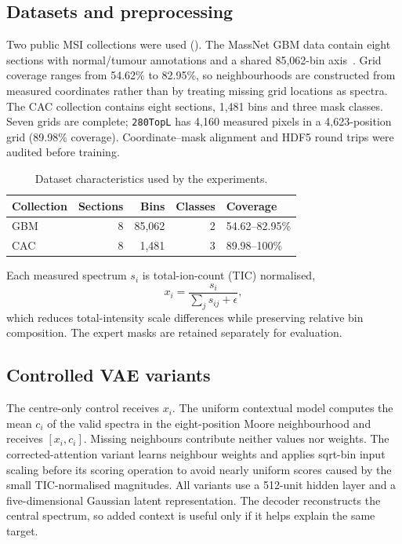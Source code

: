 \subsection{Datasets and preprocessing}

Two public MSI collections were used (). The MassNet GBM data
contain eight sections with normal/tumour annotations and a shared 85,062-bin
axis~\citep{abdelmoula2022massnet}. Grid coverage ranges from 54.62\% to
82.95\%, so neighbourhoods are constructed from measured coordinates rather
than by treating missing grid locations as spectra. The CAC collection contains
eight sections, 1,481 bins and three mask classes. Seven grids are complete;
\texttt{280TopL} has 4,160 measured pixels in a 4,623-position grid (89.98\%
coverage). Coordinate--mask alignment and HDF5 round trips were audited before
training.

\begin{table}[t]
\caption{Dataset characteristics used by the experiments.}
\label{tab:data}
\centering
\begin{tabular}{lrrrl}
\toprule
Collection & Sections & Bins & Classes & Coverage \\
\midrule
GBM & 8 & 85,062 & 2 & 54.62--82.95\% \\
CAC & 8 & 1,481 & 3 & 89.98--100\% \\
\bottomrule
\end{tabular}
\end{table}

Each measured spectrum $s_i$ is total-ion-count (TIC) normalised,
\begin{equation}
x_i = \frac{s_i}{\sum_j s_{ij}+\epsilon},
\end{equation}
which reduces total-intensity scale differences while preserving relative bin
composition. The expert masks are retained separately for evaluation.

\subsection{Controlled VAE variants}

The centre-only control receives $x_i$. The uniform contextual model computes
the mean $c_i$ of the valid spectra in the eight-position Moore neighbourhood
and receives $[x_i,c_i]$. Missing neighbours contribute neither values nor
weights. The corrected-attention variant learns neighbour weights and applies
sqrt-bin input scaling before its scoring operation to avoid nearly uniform
scores caused by the small TIC-normalised magnitudes. All variants use a
512-unit hidden layer and a five-dimensional Gaussian latent representation.
The decoder reconstructs the central spectrum, so added context is useful only
if it helps explain the same target.

